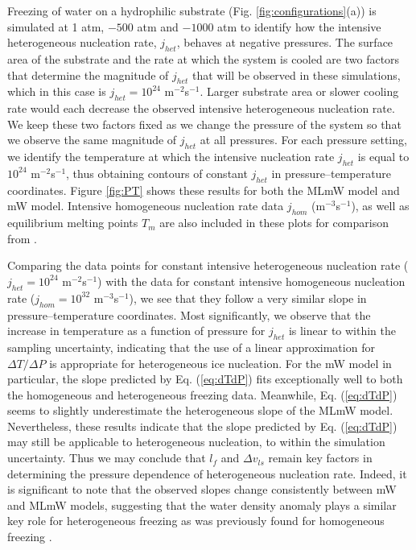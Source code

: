 \documentclass[journal abbreviation, manuscript]{copernicus}
\begin{document}
Freezing of water on a hydrophilic substrate (Fig. \ref{fig:configurations}(a)) is simulated at 1 atm, $-500$ atm and $-1000$ atm to identify how the intensive heterogeneous nucleation rate, $j_{het}$, behaves at negative pressures. The surface area of the substrate and the rate at which the system is cooled are two factors that determine the magnitude of $j_{het}$ that will be observed in these simulations, which in this case is $j_{het} = 10^{24}$ m$^{-2}$s$^{-1}$. Larger substrate area or slower cooling rate would each decrease the observed intensive heterogeneous nucleation rate. We keep these two factors fixed as we change the pressure of the system so that we observe the same magnitude of $j_{het}$ at all pressures. For each pressure setting, we identify the temperature at which the intensive nucleation rate $j_{het}$ is equal to $10^{24}$ m$^{-2}$s$^{-1}$, thus obtaining contours of constant $j_{het}$ in pressure--temperature coordinates. Figure \ref{fig:PT} shows these results for both the MLmW model and mW model. Intensive homogeneous nucleation rate data $j_{hom}$ (m$^{-3}$s$^{-1}$), as well as equilibrium melting points $T_m$ are also included in these plots for comparison from \citet{rosky2022}. 

Comparing the data points for constant intensive heterogeneous nucleation rate ($j_{het} = 10^{24}$ m$^{-2}$s$^{-1}$) with the data for constant intensive homogeneous nucleation rate ($j_{hom} = 10^{32}$ m$^{-3}$s$^{-1}$), we see that they follow a very similar slope in pressure--temperature coordinates. Most significantly, we observe that the increase in temperature as a function of pressure for $j_{het}$ is linear to within the sampling uncertainty, indicating that the use of a linear approximation for $\Delta T/\Delta P$ is appropriate for heterogeneous ice nucleation. For the mW model in particular, the slope predicted by Eq. (\ref{eq:dTdP}) fits exceptionally well to both the homogeneous and heterogeneous freezing data. Meanwhile, Eq. (\ref{eq:dTdP}) seems to slightly underestimate the heterogeneous slope of the MLmW model. Nevertheless, these results indicate that the slope predicted by Eq. (\ref{eq:dTdP}) may still be applicable to heterogeneous nucleation, to within the simulation uncertainty. Thus we may conclude that $l_f$ and $\Delta v_{ls}$ remain key factors in determining the pressure dependence of heterogeneous nucleation rate. Indeed, it is significant to note that the observed slopes change consistently between mW and MLmW models, suggesting that the water density anomaly plays a similar key role for heterogeneous freezing as was previously found for homogeneous freezing \citep{rosky2022}. 
\end{document}

